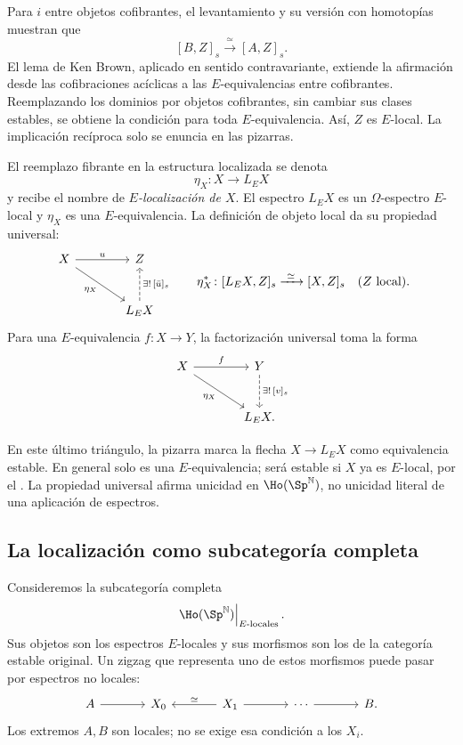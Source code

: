 Para $i$ entre objetos cofibrantes, el levantamiento y su versión con homotopías muestran que
\[
[B,Z]_s\xrightarrow{\ \simeq\ }[A,Z]_s.
\]
El lema de Ken Brown, aplicado en sentido contravariante, extiende la afirmación desde las cofibraciones acíclicas a las $E$-equivalencias entre cofibrantes. Reemplazando los dominios por objetos cofibrantes, sin cambiar sus clases estables, se obtiene la condición para toda $E$-equivalencia. Así, $Z$ es $E$-local. La implicación recíproca solo se enuncia en las pizarras.

El reemplazo fibrante en la estructura localizada se denota
\[
\eta_X\colon X\longrightarrow L_EX
\]
y recibe el nombre de \emph{$E$-localización de $X$}. El espectro $L_EX$ es un $\Omega$-espectro $E$-local y $\eta_X$ es una $E$-equivalencia. La definición de objeto local da su propiedad universal:
\[
\begin{tikzcd}[column sep=large,row sep=large]
X\arrow[r,"u"]\arrow[dr,"\eta_X"']&Z\\
&L_EX\arrow[u,dashed,"{\exists!\,[\bar u]_s}"']
\end{tikzcd}
\qquad
\eta_X^*\colon[L_EX,Z]_s\xrightarrow{\ \simeq\ }[X,Z]_s
\quad(Z\text{ local}).
\]
Para una $E$-equivalencia $f\colon X\to Y$, la factorización universal toma la forma
\[
\begin{tikzcd}[column sep=large,row sep=large]
X\arrow[r,"f"]\arrow[dr,"\eta_X"']&Y\arrow[d,dashed,"{\exists!\,[v]_s}"]\\
&L_EX.
\end{tikzcd}
\]

\begin{nota}
En este último triángulo, la pizarra marca la flecha $X\to L_EX$ como equivalencia estable. En general solo es una $E$-equivalencia; será estable si $X$ ya es $E$-local, por el . La propiedad universal afirma unicidad en $\Ho(\Sp^{\mathbb N})$, no unicidad literal de una aplicación de espectros.
\end{nota}

\subsection{La localización como subcategoría completa}
Consideremos la subcategoría completa
\[
\left.\Ho(\Sp^{\mathbb N})\right|_{E\text{-locales}}.
\]
Sus objetos son los espectros $E$-locales y sus morfismos son los de la categoría estable original. Un zigzag que representa uno de estos morfismos puede pasar por espectros no locales:
\[
\begin{tikzcd}[column sep=large]
A\arrow[r]&X_0&X_1\arrow[l,"\simeq"']\arrow[r]&\cdots\arrow[r]&B.
\end{tikzcd}
\]
Los extremos $A,B$ son locales; no se exige esa condición a los $X_i$.

